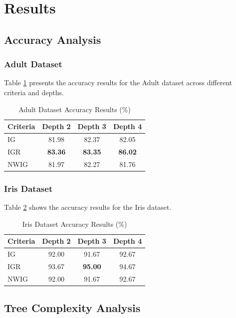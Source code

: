 \documentclass{article}
\begin{document}
\section{Results}

\subsection{Accuracy Analysis}

\subsubsection{Adult Dataset}
Table \ref{tab:adult_accuracy} presents the accuracy results for the Adult dataset across different criteria and depths.

\begin{table}[H]
\centering
\caption{Adult Dataset Accuracy Results (\%)}
\label{tab:adult_accuracy}
\begin{tabular}{@{}lccc@{}}
\toprule
\textbf{Criteria} & \textbf{Depth 2} & \textbf{Depth 3} & \textbf{Depth 4} \\
\midrule
IG & 81.98 & 82.37 & 82.05 \\
IGR & \textbf{83.36} & \textbf{83.35} & \textbf{86.02} \\
NWIG & 81.97 & 82.27 & 81.76 \\
\bottomrule
\end{tabular}
\end{table}

\subsubsection{Iris Dataset}
Table \ref{tab:iris_accuracy} shows the accuracy results for the Iris dataset.

\begin{table}[H]
\centering
\caption{Iris Dataset Accuracy Results (\%)}
\label{tab:iris_accuracy}
\begin{tabular}{@{}lccc@{}}
\toprule
\textbf{Criteria} & \textbf{Depth 2} & \textbf{Depth 3} & \textbf{Depth 4} \\
\midrule
IG & 92.00 & 91.67 & 92.67 \\
IGR & 93.67 & \textbf{95.00} & 94.67 \\
NWIG & 92.00 & 91.67 & 92.67 \\
\bottomrule
\end{tabular}
\end{table}

\subsection{Tree Complexity Analysis}
\end{document}
